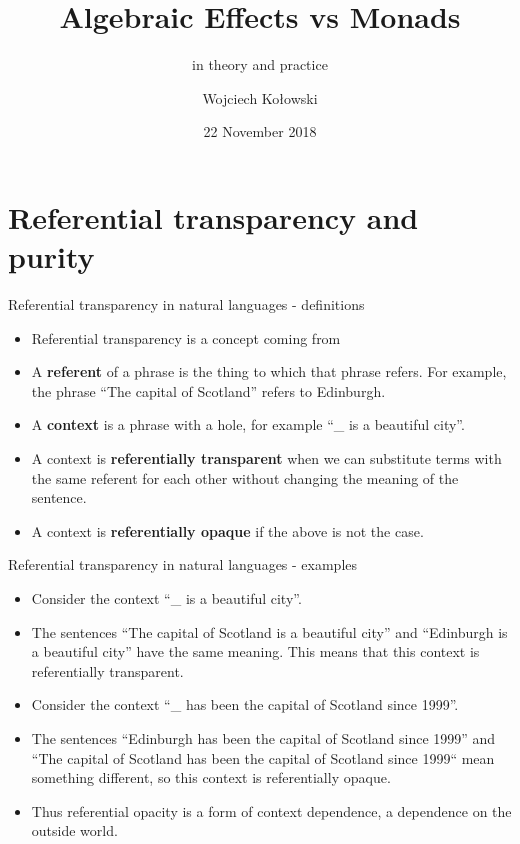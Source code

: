 \documentclass{beamer}
\title{Algebraic Effects vs Monads}
\subtitle{in theory and practice}
\author{Wojciech Kołowski}
\date{22 November 2018}
\newcommand{\link}[2]{\href{#2}{\color{blue}{#1}}}
\begin{document}
\frame{\titlepage}

\frame{\tableofcontents}

\section{Referential transparency and purity}

\begin{frame}{Referential transparency in natural languages - definitions}
\begin{itemize}
	\item Referential transparency is a concept coming from \link{analytic philosophy}{https://en.wikipedia.org/wiki/Analytic_philosophy}
	\item A \textbf{referent} of a phrase is the thing to which that phrase refers. For example, the phrase ``The capital of Scotland'' refers to Edinburgh.
	\item A \textbf{context} is a phrase with a hole, for example ``\_ is a beautiful city''.
	\item A context is \textbf{referentially transparent} when we can substitute terms with the same referent for each other without changing the meaning of the sentence.
	\item A context is \textbf{referentially opaque} if the above is not the case.
\end{itemize}
\end{frame}

\begin{frame}{Referential transparency in natural languages - examples}
\begin{itemize}
	\item Consider the context ``\_ is a beautiful city''.
	\item The sentences ``The capital of Scotland is a beautiful city'' and ``Edinburgh is a beautiful city'' have the same meaning. This means that this context is referentially transparent.
	\item Consider the context ``\_ has been the capital of Scotland since 1999''.
	\item The sentences ``Edinburgh has been the capital of Scotland since 1999'' and ``The capital of Scotland has been the capital of Scotland since 1999`` mean something different, so this context is referentially opaque.
	\item Thus referential opacity is a form of context dependence, a dependence on the outside world.
\end{itemize}
\end{frame}
\end{document}
